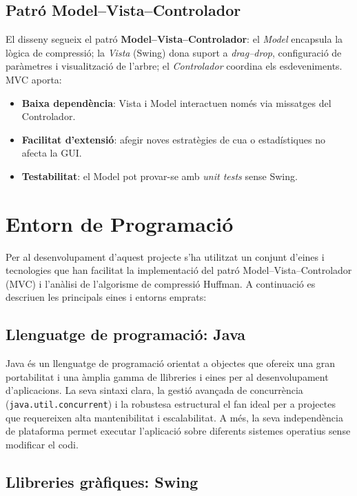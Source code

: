 \documentclass{ieeetj}
\begin{document}
\subsection{Patró Model–Vista–Controlador}
El disseny segueix el patró \textbf{Model–Vista–Controlador}: el
\emph{Model} encapsula la lògica de compressió; la \emph{Vista} (Swing)
dona suport a \emph{drag–drop}, configuració de paràmetres i visualització
de l’arbre; el \emph{Controlador} coordina els esdeveniments.
MVC \cite{Reenskaug1979} aporta:
\begin{itemize}
  \item \textbf{Baixa dependència}: Vista i Model interactuen només via missatges del Controlador.
  \item \textbf{Facilitat d’extensió}: afegir noves estratègies de cua o estadístiques no afecta la GUI.
  \item \textbf{Testabilitat}: el Model pot provar-se amb \textit{unit tests} sense Swing.
\end{itemize}

\section{Entorn de Programació}
Per al desenvolupament d’aquest projecte s’ha utilitzat un conjunt d’eines i tecnologies que han facilitat la implementació del patró Model–Vista–Controlador (MVC) i l'anàlisi de l’algorisme de compressió Huffman. A continuació es descriuen les principals eines i entorns emprats:

\subsection{Llenguatge de programació: Java}

Java és un llenguatge de programació orientat a objectes que ofereix una gran portabilitat i una àmplia gamma de llibreries i eines per al desenvolupament d'aplicacions.  
La seva sintaxi clara, la gestió avançada de concurrència (\texttt{java.util.concurrent}) i la robustesa estructural el fan ideal per a projectes que requereixen alta mantenibilitat i escalabilitat.  
A més, la seva independència de plataforma permet executar l’aplicació sobre diferents sistemes operatius sense modificar el codi.

\subsection{Llibreries gràfiques: Swing}
\end{document}
